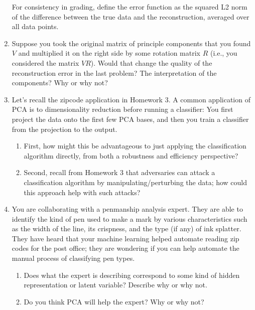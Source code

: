 \documentclass[submit]{../harvardml}
\begin{document}
\begin{problem}
\begin{enumerate}
    For consistency in grading, define the error function as the squared L2
    norm of the difference between the true data and the reconstruction, averaged over all data points.
  
    \item Suppose you took the original matrix of principle components
    that you found $V$ and multiplied it on the right side by some rotation matrix $R$ (i.e., you considered the matrix $VR$).
    Would that change the quality of the reconstruction error in the
    last problem?  The interpretation of the components?  Why or why
    not?

    \item Let's recall the zipcode application in Homework 3.  A common
    application of PCA is to dimensionality reduction before running a
    classifier: You first project the data onto the first few PCA bases,
    and then you train a classifier from the projection to the output.
    \begin{enumerate}
      \item First, how might this be advantageous to just applying the classification algorithm directly, from both a robustness and efficiency perspective? 
      
      \item Second, recall from Homework 3 that adversaries can attack a classification algorithm by manipulating/perturbing the data; how could this approach help with such attacks?
    \end{enumerate}

    \item You are collaborating with a penmanship analysis expert.  They
    are able to identify the kind of pen used to make a mark by various
    characteristics such as the width of the line, its crispness, and
    the type (if any) of ink splatter.  They have heard that your
    machine learning helped automate reading zip codes for the post
    office; they are wondering if you can help automate the manual
    process of classifying pen types.
    \begin{enumerate}

      \item Does what the expert is describing correspond to some kind
      of hidden representation or latent variable?  Describe why or
      why not.
      
      \item Do you think PCA will help the expert?  Why or why not?
    \end{enumerate}
  \end{enumerate}
\end{problem}
\end{document}
